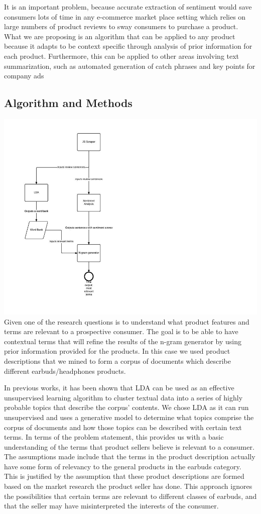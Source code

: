 \documentclass{article}
\begin{document}
It is an important problem, because accurate extraction of sentiment would save consumers lots of time in any e-commerce market place setting which relies on large numbers of product reviews to sway consumers to purchase a product. What we are proposing is an algorithm that can be applied to any product because it adapts to be context specific through analysis of prior information for each product. Furthermore, this can be applied to other areas involving text summarization, such as automated generation of catch phrases and key points for company ads
\subsection{Algorithm and Methods}
\includegraphics{flow.jpg}
Given one of the research questions is to understand what product features and terms are relevant to a prospective consumer. The goal is to be able to have contextual terms that will refine the results of the n-gram generator by using prior information provided for the products. In this case we used product descriptions that we mined to form a corpus of documents which describe different earbuds/headphones products. 

In previous works, it has been shown that LDA can be used as an effective unsupervised learning algorithm to cluster textual data into a series of highly probable topics that describe the corpus' contents. We chose LDA as it can run unsupervised and uses a generative model to determine what topics comprise the corpus of documents and how those topics can be described with certain text terms. In terms of the problem statement, this provides us with a basic understanding of the terms that product sellers believe is relevant to a consumer. The assumptions made include that the terms in the product description actually have some form of relevancy to the general products in the earbuds category. This is justified by the assumption that these product descriptions are formed based on the market research the product seller has done. This approach ignores the possibilities that certain terms are relevant to different classes of earbuds, and that the seller may have misinterpreted the interests of the consumer.
\end{document}
